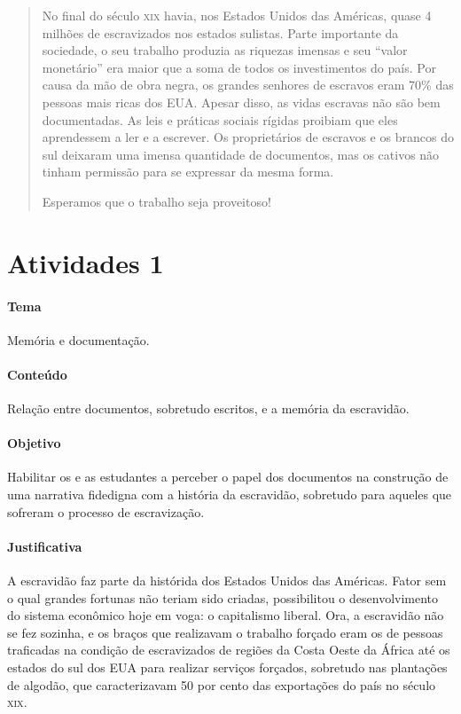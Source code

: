 \documentclass[11pt]{extarticle}
\begin{document}
\begin{abstract}
No final do século \textsc{xix} havia, nos Estados Unidos das Américas, 
quase 4 milhões de escravizados nos estados sulistas. Parte importante 
da sociedade, o seu trabalho produzia as riquezas imensas e seu ``valor 
monetário'' era maior que a soma de todos os investimentos do país. 
Por causa da mão de obra negra, os grandes senhores de escravos eram 70\% 
das pessoas mais ricas dos {EUA}. Apesar disso, as vidas escravas 
não são bem documentadas. As leis e práticas sociais rígidas proibiam 
que eles aprendessem a ler e a escrever. Os proprietários de escravos 
e os brancos do sul deixaram uma imensa quantidade de documentos, mas 
os cativos não tinham permissão para se expressar da mesma forma.

Esperamos que o trabalho seja proveitoso!


\end{abstract}

\tableofcontents

\section{Atividades 1}




\paragraph{Tema} Memória e documentação.

\paragraph{Conteúdo} Relação entre documentos, sobretudo escritos, e a memória da escravidão.

\paragraph{Objetivo} Habilitar os e as estudantes a perceber o papel dos documentos na 
construção de uma narrativa fidedigna com a história da escravidão, sobretudo para aqueles
que sofreram o processo de escravização.

\paragraph{Justificativa} A escravidão faz parte da histórida dos Estados Unidos das Américas.
Fator sem o qual grandes fortunas não teriam sido criadas, possibilitou o desenvolvimento
do sistema econômico hoje em voga: o capitalismo liberal. Ora, a escravidão não se fez sozinha, 
e os braços que realizavam o trabalho forçado eram os de pessoas traficadas na condição de escravizados
de regiões da Costa Oeste da África até os estados do sul dos EUA para realizar serviços forçados,
sobretudo nas plantações de algodão, que caracterizavam 50 por cento das exportações do país no século \textsc{xix}. 
\end{document}
